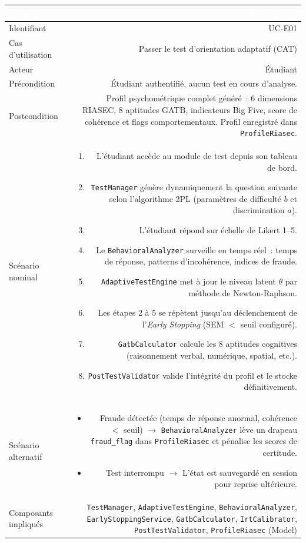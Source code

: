 \documentclass[a4paper,12pt]{article}
\begin{document}
\noindent
\begin{tabular}{|L|R|}
\hline
{}\textcolor{white}{\textbf{Champ}} & \textcolor{white}{\textbf{Description}} \\
\hline
{}Identifiant & UC-E01 \\
\hline
Cas d'utilisation & Passer le test d'orientation adaptatif (CAT) \\
\hline
{}Acteur & Étudiant \\
\hline
Précondition & Étudiant authentifié, aucun test en cours d'analyse. \\
\hline
{}Postcondition & Profil psychométrique complet généré~: 6 dimensions RIASEC, 8 aptitudes GATB, indicateurs Big Five, score de cohérence et flags comportementaux. Profil enregistré dans \texttt{ProfileRiasec}. \\
\hline
Scénario nominal &
\begin{enumerate}
  \item L'étudiant accède au module de test depuis son tableau de bord.
  \item \texttt{TestManager} génère dynamiquement la question suivante selon l'algorithme 2PL (paramètres de difficulté $b$ et discrimination $a$).
  \item L'étudiant répond sur échelle de Likert 1--5.
  \item Le \texttt{BehavioralAnalyzer} surveille en temps réel~: temps de réponse, patterns d'incohérence, indices de fraude.
  \item \texttt{AdaptiveTestEngine} met à jour le niveau latent $\theta$ par méthode de Newton-Raphson.
  \item Les étapes 2 à 5 se répètent jusqu'au déclenchement de l'\textit{Early Stopping} (SEM $<$ seuil configuré).
  \item \texttt{GatbCalculator} calcule les 8 aptitudes cognitives (raisonnement verbal, numérique, spatial, etc.).
  \item \texttt{PostTestValidator} valide l'intégrité du profil et le stocke définitivement.
\end{enumerate} \\
\hline
{}Scénario alternatif &
\begin{itemize}
  \item Fraude détectée (temps de réponse anormal, cohérence $<$ seuil) $\rightarrow$ \texttt{BehavioralAnalyzer} lève un drapeau \texttt{fraud\_flag} dans \texttt{ProfileRiasec} et pénalise les scores de certitude.
  \item Test interrompu $\rightarrow$ L'état est sauvegardé en session pour reprise ultérieure.
\end{itemize} \\
\hline
Composants impliqués & \texttt{TestManager}, \texttt{AdaptiveTestEngine}, \texttt{BehavioralAnalyzer}, \texttt{EarlyStoppingService}, \texttt{GatbCalculator}, \texttt{IrtCalibrator}, \texttt{PostTestValidator}, \texttt{ProfileRiasec} (Model) \\
\hline
\end{tabular}
\end{document}

